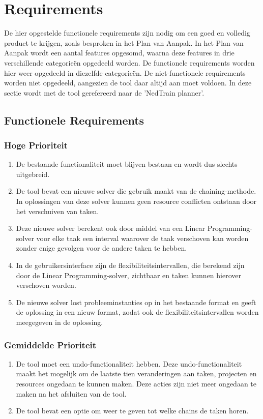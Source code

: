 \section{Requirements}
De hier opgestelde functionele requirements zijn nodig om een goed en volledig product te krijgen, zoals besproken in het Plan van Aanpak. In het Plan van Aanpak wordt een aantal features opgesomd, waarna deze features in drie verschillende categorie\"en opgedeeld worden. De functionele requirements worden hier weer opgedeeld in diezelfde categorie\"en. De niet-functionele requirements worden niet opgedeeld, aangezien de tool daar altijd aan moet voldoen. In deze sectie wordt met de tool gerefereerd naar de 'NedTrain planner'.

\subsection{Functionele Requirements}
\subsubsection*{Hoge Prioriteit}
\begin{enumerate}
    \item De bestaande functionaliteit moet blijven bestaan en wordt dus slechts uitgebreid.
    \item De tool bevat een nieuwe solver die gebruik maakt van de chaining-methode. In oplossingen van deze solver kunnen geen resource conflicten ontstaan door het verschuiven van taken.
    \item Deze nieuwe solver berekent ook door middel van een Linear Programming-solver voor elke taak een interval waarover de taak verschoven kan worden zonder enige gevolgen voor de andere taken te hebben.
    \item In de gebruikersinterface zijn de flexibiliteitsintervallen, die berekend zijn door de Linear Programming-solver, zichtbaar en taken kunnen hierover verschoven worden.
    \item De nieuwe solver lost probleeminstanties op in het bestaande format en geeft de oplossing in een nieuw format, zodat ook de flexibiliteitsintervallen worden meegegeven in de oplossing.
\end{enumerate}

\subsubsection*{Gemiddelde Prioriteit}
\begin{enumerate}[resume]
    \item De tool moet een undo-functionaliteit hebben. Deze undo-functionaliteit maakt het mogelijk om de laatste tien veranderingen aan taken, projecten en resources ongedaan te kunnen maken. Deze acties zijn niet meer ongedaan te maken na het afsluiten van de tool.
    \item De tool bevat een optie om weer te geven tot welke chains de taken horen. 
\end{enumerate}

